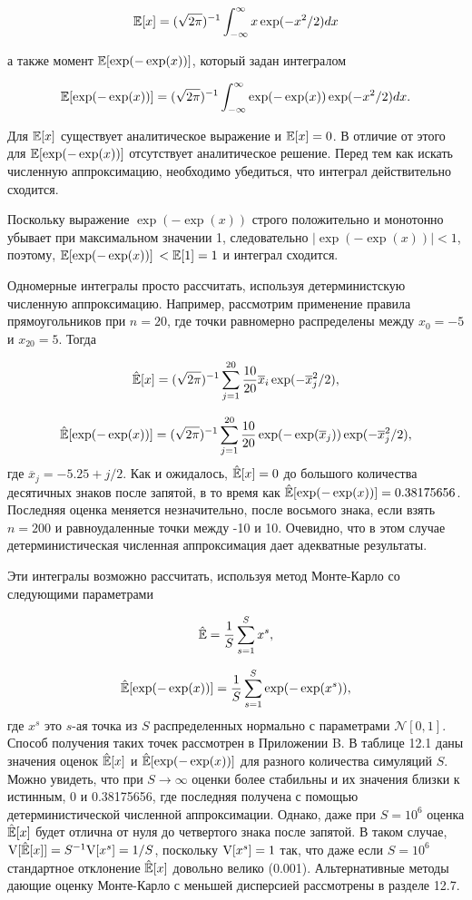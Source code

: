 \[
\mathbb{E}[x]=(\sqrt{2\pi})^{-1}\int^{\infty}_{-\infty}x\exp(-x^{2}/2)dx
\]

а также момент $\mathbb{E}[\exp(-\exp(x))]$, который задан интегралом 

\[
\mathbb{E}[\exp(-\exp(x))]=(\sqrt{2\pi})^{-1}\int^{\infty}_{-\infty}\exp(-\exp(x))\exp(-x^{2}/2)dx.
\]

Для $\mathbb{E}[x]$ существует аналитическое выражение и $\mathbb{E}[x]=0$. В отличие от этого для $\mathbb{E}[\exp(-\exp(x))]$ отсутствует аналитическое решение. Перед тем как искать численную аппроксимацию, необходимо убедиться, что интеграл действительно сходится. 

Поскольку выражение $\exp(-\exp(x))$ строго положительно и монотонно убывает при максимальном значении 1, следовательно $|\exp(-\exp(x))|<1$, поэтому, $\mathbb{E}[\exp(-\exp(x))]$ $<\mathbb{E}[1]=1$ и интеграл сходится.

Одномерные интегралы просто рассчитать, используя детерминистскую численную аппроксимацию. Например, рассмотрим применение правила прямоугольников при $n=20$, где точки равномерно распределены между $x_0=-5$ и $x_{20}=5$. Тогда

\[
\hat{\mathbb{E}}[x]=(\sqrt{2\pi})^{-1}\sum^{20}_{j=1}\dfrac{10}{20}\overline{x}_{i}\exp(-\overline{x}^{2}_{j}/2),
\]

\[
\hat{\mathbb{E}}[\exp(-\exp(x))]=(\sqrt{2\pi})^{-1}\sum^{20}_{j=1}\dfrac{10}{20}\exp(-\exp(\overline{x}_j))\exp(-\overline{x}^{2}_{j}/2),
\]
где $\overline{x}_j=-5.25+j/2$. Как и ожидалось, $\hat{\mathbb{E}}[x]=0$ до большого количества десятичных знаков после запятой, в то время как $\hat{\mathbb{E}}[\exp(-\exp(x))]=0.38175656$. Последняя оценка меняется незначительно, после восьмого знака, если взять $n=200$ и  равноудаленные точки между -10 и 10. Очевидно, что в этом случае детерминистическая численная аппроксимация дает адекватные результаты.

Эти интегралы возможно рассчитать, используя метод Монте-Карло со следующими параметрами

\[
\hat{\mathbb{E}}=\dfrac{1}{S}\sum^{S}_{s=1}x^{s},
\]

\[
\hat{\mathbb{E}}[\exp(-\exp(x))]=\dfrac{1}{S}\sum^{S}_{s=1}\exp(-\exp(x^s)),
\]
где $x^s$ это $s$-ая точка из $S$ распределенных нормально с параметрами $\mathcal{N}[0,1]$. Способ получения таких точек рассмотрен в Приложении B. В таблице 12.1 даны значения оценок $\hat{\mathbb{E}}[x]$ и $\hat{\mathbb{E}}[\exp(-\exp(x))]$ для разного количества симуляций $S$. Можно увидеть, что при $S \rightarrow \infty$ оценки более стабильны и их значения близки к истинным, 0 и 0.38175656, где последняя получена с помощью детерминистической численной аппроксимации. Однако, даже при $S=10^6$ оценка $\hat{\mathbb{E}}[x]$ будет отлична от нуля до четвертого знака после запятой. В таком случае, $\mathrm{V}[\hat{\mathbb{E}}[x]]=S^{-1}\mathrm{V}[x^s]=1/S$, поскольку $\mathrm{V}[x^s]=1$ так, что даже если $S=10^6$ стандартное отклонение $\hat{\mathbb{E}}[x]$ довольно велико (0.001). Альтернативные методы дающие оценку Монте-Карло с меньшей дисперсией  рассмотрены в разделе 12.7.
 
